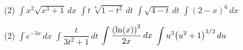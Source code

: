 \documentclass[../mathNotesPreamble]{subfiles}
\begin{document}
  \begin{extasks}[after-item-skip=\stretch{1}](2)
    \task $\displaystyle\int x^2\sqrt{x^3+1}\, dx$
    \task $\displaystyle\int t\,\sqrt[4]{1-t^2}\,dt$
    \task $\displaystyle\int\sqrt{4-t}\,dt$
    \task $\displaystyle\int (2-x)^6\,dx$
  \end{extasks}
  \pagebreak

  \begin{extasks}[after-item-skip=\stretch{1}](2)
    \task $\displaystyle\int e^{-3x}\,dx$
    \task $\displaystyle\int \dfrac{t}{3t^2+1}\,dt$
    \task $\displaystyle\int \dfrac{{\left(\ln(x)\right)}^2}{2x}\,dx$
    \task $\displaystyle\int u^3{\left(u^2+1\right)}^{3/2}\,du$
  \end{extasks}

  \pagebreak
\end{document}

